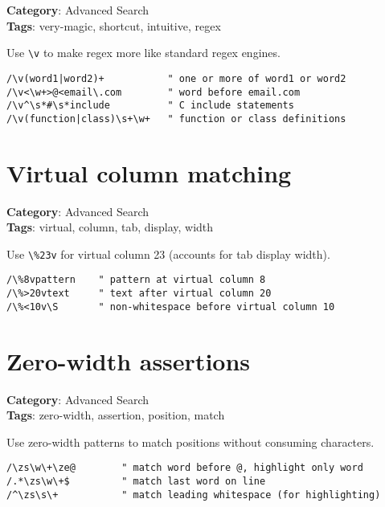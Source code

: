 {\textbf{Category}: Advanced Search\\ \textbf{Tags}: very-magic, shortcut, intuitive, regex
\vspace{0.5cm}

Use {\footnotesize \Verb§\v§} to make regex more like standard regex engines.

\begin{Exa*}{}
\begin{Verbatim}[fontsize=\footnotesize, breaklines, breakanywhere]
/\v(word1|word2)+           " one or more of word1 or word2
/\v<\w+>@<email\.com        " word before email.com
/\v^\s*#\s*include          " C include statements
/\v(function|class)\s+\w+   " function or class definitions
\end{Verbatim}
\end{Exa*}

\section{Virtual column matching}

\textbf{Category}: Advanced Search\\ \textbf{Tags}: virtual, column, tab, display, width
\vspace{0.5cm}

Use {\footnotesize \Verb§\%23v§} for virtual column 23 (accounts for tab display width).

\begin{Exa*}{}
\begin{Verbatim}[fontsize=\footnotesize, breaklines, breakanywhere]
/\%8vpattern    " pattern at virtual column 8
/\%>20vtext     " text after virtual column 20
/\%<10v\S       " non-whitespace before virtual column 10
\end{Verbatim}
\end{Exa*}

\section{Zero-width assertions}

\textbf{Category}: Advanced Search\\ \textbf{Tags}: zero-width, assertion, position, match
\vspace{0.5cm}

Use zero-width patterns to match positions without consuming characters.

\begin{Exa*}{}
\begin{Verbatim}[fontsize=\footnotesize, breaklines, breakanywhere]
/\zs\w\+\ze@        " match word before @, highlight only word
/.*\zs\w\+$         " match last word on line
/^\zs\s\+           " match leading whitespace (for highlighting)
\end{Verbatim}
\end{Exa*}

}
